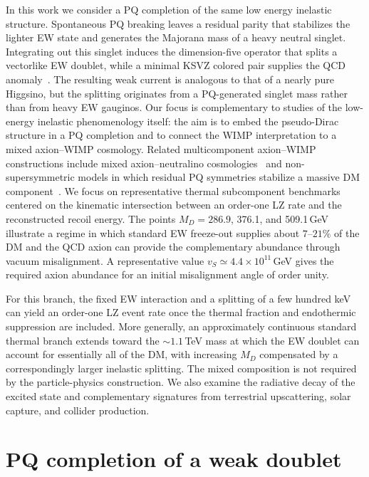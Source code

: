 \documentclass[aps,prd,reprint,preprintnumbers,superscriptaddress,nofootinbib,floatfix]{revtex4-2}
\begin{document}
In this work we consider a PQ completion of the same low energy inelastic structure. Spontaneous PQ breaking leaves a residual parity that stabilizes the lighter EW state and generates the Majorana mass of a heavy neutral singlet. Integrating out this singlet induces the dimension-five operator that splits a vectorlike EW doublet, while a minimal KSVZ colored pair supplies the QCD anomaly~\cite{Kim:1979if,Shifman:1979if}. The resulting weak current is analogous to that of a nearly pure Higgsino, but the splitting originates from a PQ-generated singlet mass rather than from heavy EW gauginos. Our focus is complementary to studies of the low-energy inelastic phenomenology itself: the aim is to embed the pseudo-Dirac structure in a PQ completion and to connect the WIMP interpretation to a mixed axion--WIMP cosmology. Related multicomponent axion--WIMP constructions include mixed axion--neutralino cosmologies~\cite{Baer:2011hx,Bae:2013hma} and non-supersymmetric models in which residual PQ symmetries stabilize a massive DM component~\cite{Dasgupta:2013cwa,Longas:2023bvq}. We focus on representative thermal subcomponent benchmarks centered on the kinematic intersection between an order-one LZ rate and the reconstructed recoil energy. The points $M_D=286.9$, 376.1, and 509.1\,GeV illustrate a regime in which standard EW freeze-out supplies about $7$--$21\%$ of the DM and the QCD axion can provide the complementary abundance through vacuum misalignment. A representative value $v_S\simeq4.4\times10^{11}$\,GeV gives the required axion abundance for an initial misalignment angle of order unity.

For this branch, the fixed EW interaction and a splitting of a few hundred keV can yield an order-one LZ event rate once the thermal fraction and endothermic suppression are included. More generally, an approximately continuous standard thermal branch extends toward the $\sim1.1$\,TeV mass at which the EW doublet can account for essentially all of the DM, with increasing $M_D$ compensated by a correspondingly larger inelastic splitting. The mixed composition is not required by the particle-physics construction. We also examine the radiative decay of the excited state and complementary signatures from terrestrial upscattering, solar capture, and collider production.

\section{PQ completion of a weak doublet}
\label{sec:model}
\end{document}
